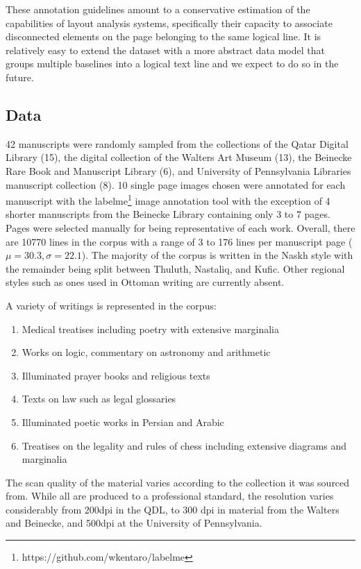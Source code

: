 These annotation guidelines amount to a conservative estimation of the
capabilities of layout analysis systems, specifically their capacity to
associate disconnected elements on the page belonging to the same logical line.
It is relatively easy to extend the dataset with a more abstract data model
that groups multiple baselines into a logical text line and we expect to do so
in the future.


\subsection{Data}


42 manuscripts were randomly sampled from the collections of the Qatar Digital
Library (15), the digital collection of the Walters Art Museum (13), the
Beinecke Rare Book and Manuscript Library (6), and University of Pennsylvania
Libraries manuscript collection (8). 10 single page images chosen were
annotated for each manuscript with the
labelme\footnote{https://github.com/wkentaro/labelme} image annotation tool
with the exception of 4 shorter manuscripts from the Beinecke Library
containing only 3 to 7 pages. Pages were selected manually for being
representative of each work. Overall, there are 10770 lines in the corpus with
a range of 3 to 176 lines per manuscript page ($\mu = 30.3, \sigma = 22.1$).
The majority of the corpus is written in the Naskh style with the remainder
being split between Thuluth, Nastaliq, and Kufic. Other regional styles such as
ones used in Ottoman writing are currently absent.

A variety of writings is represented in the corpus:

\begin{enumerate}
	\item Medical treatises including poetry with extensive marginalia
	\item Works on logic, commentary on astronomy and arithmetic
	\item Illuminated prayer books and religious texts
	\item Texts on law such as legal glossaries
	\item Illuminated poetic works in Persian and Arabic
	\item Treatises on the legality and rules of chess including extensive diagrams and marginalia
\end{enumerate}

The scan quality of the material varies according to the collection it was
sourced from. While all are produced to a professional standard, the resolution
varies considerably from 200dpi in the QDL, to 300 dpi in material from the
Walters and Beinecke, and 500dpi at the University of Pennsylvania.

